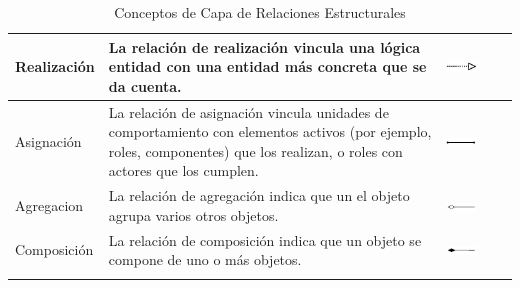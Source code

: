\begin{center}
\begin{longtable}[H]{| >{\centering\arraybackslash}m{3cm} | >{\arraybackslash}m{6cm} | p{4cm} | p{5cm} | p{4cm} |}
		Realización	
		& \vspace{1mm} La relación de realización vincula una lógica
		entidad con una entidad más concreta que
		se da cuenta.              
		& \includegraphics[width=35mm,trim=0 0 0 -2mm]{imagenes/lenguaje/relaciones/realizacion}  \\ \hline
		
		Asignación &\vspace{1mm} La relación de asignación vincula unidades de
		comportamiento con elementos activos (por ejemplo, roles,
		componentes) que los realizan, o roles con
		actores que los cumplen. 
		&  \includegraphics[width=35mm,trim=0 0 0 -2mm]{imagenes/lenguaje/relaciones/asignacion}  \\ \hline
		
		Agregacion
		&\vspace{1mm}  La relación de agregación indica que un
		el objeto agrupa varios otros objetos.
		& \includegraphics[width=35mm,trim=0 0 0 -2mm]{imagenes/lenguaje/relaciones/agregacion}  \\ \hline 
		
		Composición 
		&\vspace{1mm} La relación de composición indica que
		un objeto se compone de uno o más
		objetos.
		& \includegraphics[width=35mm,trim=0 0 0 -2mm]{imagenes/lenguaje/relaciones/composicion}  \\ \hline 			
		
		\caption{Conceptos de Capa de Relaciones Estructurales}
		
	\end{longtable}
\end{center}

